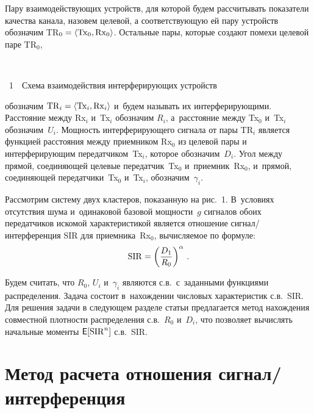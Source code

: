 \begin{multicols}{2}
  Пару взаимодействующих устройств, для которой будем рассчитывать
показатели качества канала, назовем целевой, а соответствующую ей пару
устройств обозначим TR$_0\hm= \langle \mathrm{Tx}_0, \mathrm{Rx}_0\rangle$.
Остальные пары, которые создают помехи целевой паре 
$\mathrm{TR}_0$,\linebreak\vspace*{-12pt}
\begin{center}  %
\vspace*{8pt}
\mbox{%
 \epsfxsize=77.569mm
 }
\end{center}

\noindent
{{\figurename~1}\ \ \small{Схема взаимодействия интерферирующих устройств}}




\addtocounter{figure}{1}


\noindent
 обозначим $\mathrm{TR}_i\hm= \langle
\mathrm{Tx}_i, \mathrm{Rx}_i\rangle$ и~будем называть их интерферирующими. Расстояние
между Rx$_i$ и~Tx$_i$ обозначим $R_i$, а~расстояние между Tx$_0$ и~Tx$_i$
обозначим~$U_i$. Мощность интерферирующего сигнала от пары TR$_i$
является функцией расстояния между приемником Rx$_0$ из целевой пары и
интерферирующим передатчиком~Tx$_i$, которое обозначим~$D_i$. Угол
между прямой, соединяющей целевые передатчик~Tx$_0$ и~приемник~Rx$_0$,
и~прямой, соеди\-ня\-ющей передатчики~Tx$_0$ и~Tx$_i$,
обозначим~$\gamma_i$.

  Рассмотрим систему двух кластеров, показанную на рис.~1. В~условиях
отсутствия шума и~одинаковой базовой мощности~$g$ сигналов обоих
передатчиков искомой характеристикой является отношение
  сигнал/ин\-тер\-фе\-рен\-ция SIR для приемника~Rx$_0$, вычисляемое по
формуле:
  \begin{equation}
\mathrm{SIR}=\left( \displaystyle\frac{\displaystyle D_1\mathstrut}{\displaystyle R_0\mathstrut}\right)^{\alpha}\,.
  \label{e3-gai}
  \end{equation}

  Будем считать, что $R_0$, $U_i$ и~$\gamma_i$ являются
с.в.\ с~заданными функциями распределения. Задача состоит
в~нахождении числовых характеристик с.в.~SIR. Для
решения задачи в следующем разделе статьи предлагается метод нахождения
совместной плотности распределения с.в.~$R_0$ и~$D_i$, что позволяет
вычислять начальные моменты ${\sf E}[\mathrm{SIR}^n]$ с.в.~SIR.

\vspace*{-6pt}

\section{Метод расчета отношения сигнал/интерференция}


\end{multicols}
